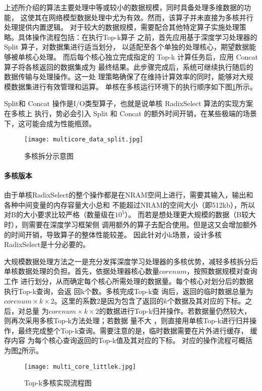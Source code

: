 上述所介绍的算法主要处理中等或较小的数据规模，同时具备处理多维数据的功能，
这使其在网络模型数据处理中尤为有效。然而，该算子并未直接为多核并行处理提供内置逻辑。
对于较大的数据规模，需要配合其他特定算子实施处理策略。具体操作流程包括：在执行Top-k算子
之前，首先应用基于深度学习处理器的 Split 算子，对数据集进行适当划分，
以适配至各个单独的处理核心，期望数据能够被单核心处理。
而后每个核心独立完成指定的 Top-k 计算任务后，应用 Concat 算子将各核返回的数据集成为
最终结果。此步骤完成后，系统可继续执行随后的数据传输与处理操作。这一处
理策略确保了在维持计算效率的同时，能够对大规模数据集进行有效管理和运算。
单核在多核运行环境下的执行顺序如下图\ref{fig:duohe_split}所示。


Split和 Concat 操作是I/O类型算子，也就是说单核 RadixSelect 算法的实现方案在多核上
执行，势必会引入 Split 和 Concat 的额外时间开销，在某些极端的场景下，这可能会成为性能瓶颈。
\begin{figure}[ht]
    \centering
    \texttt{[image: multicore\_data\_split.jpg]}
    \caption{多核拆分示意图}
    \label{fig:duohe_split}
\end{figure}

\paragraph{多核版本}
由于单核RadixSelect的整个操作都是在NRAM空间上进行，需要其输入，输出和各种中间变量的内存容量大小总和
不能超过NRAM的空间大小（即512kb），所以对B的大小要求比较严格（数量级在$10^5$）。
而若是想处理更大规模的数据（B较大时），则需要在深度学习框架侧
调用额外的算子去配合使用。但是这又会增加额外的时间开销，导致算子的整体性能较差。
因此针对小k场景，设计多核RadixSelect是十分必要的。

大规模数据处理方法之一是充分发挥深度学习处理器的多核优势，减轻多核拆分后单核数据处理的负担。首先，依据处理器核心数量\(corenum\)，按照数据规模对查询工作
进行划分，从而确定每个核心所需处理的数据量。每个核心对划分后的数据执行Top-k查询，会返
回k个数。多核完成Top-k查
询后，返回的临时数据总量为\(corenum×k×2\)。这里的系数\(2\)是因为包含了返回的\(k\)个数据及其对应的下标。之后，对总量
为\(corenum×k×2\)的数据进行Top-k归并操作。若数据量仍然较大，则再次采用多核Top-k方法处理；若数据
量不大
，则直接用单核Top-k进行归并操作，最终完成整个Top-k查询。需要注意的是，临时数据需要在片外进行缓存，
缓存内容
为每个核心查询返回的Top-k值及其对应的下标。
对应的操作流程可概括为图\ref{fig:multi_core_littlek}所示。
\begin{figure}[ht]
    \centering
    \texttt{[image: multi\_core\_littlek.jpg]}
    \caption{Top-k多核实现流程图}
    \label{fig:multi_core_littlek}
\end{figure}
    
